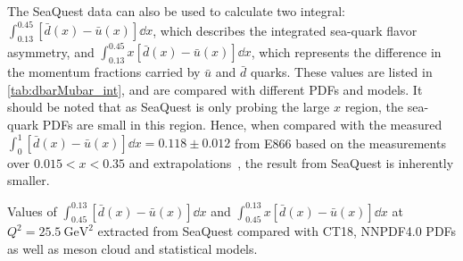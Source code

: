 \documentclass[../main.tex]{subfiles}
\begin{document}
The SeaQuest data can also be used to calculate two integral: $\int^{0.45}_{0.13} \left[\bar{d}\left(x\right) - \bar{u}\left(x\right) \right]\dd{x}$,
which describes the integrated sea-quark flavor asymmetry, and $\int^{0.45}_{0.13} x\left[\bar{d}\left(x\right) - \bar{u}\left(x\right) \right]\dd{x}$,
which represents the difference in the momentum fractions carried by $\bar{u}$ and $\bar{d}$ quarks.
These values are listed in \cref{tab:dbarMubar_int}, and are compared with different PDFs and models.
It should be noted that as SeaQuest is only probing the large $x$ region, the sea-quark PDFs are small in this region.
Hence, when compared with the measured $\int^{1}_{0} \left[\bar{d}\left(x\right) - \bar{u}\left(x\right) \right]\dd{x}=0.118\pm 0.012$
from E866 based on the measurements over $0.015<x<0.35$ and extrapolations~\cite{towell2001},
the result from SeaQuest is inherently smaller.
\begin{table}[htpb!]
	\centering
	\caption{Values of $\int_{0.45}^{0.13} \left[\bar{d}\left(x\right) - \bar{u}\left(x\right)\right] \dd{x}$
		and $\int_{0.45}^{0.13} x\left[\bar{d}\left(x\right) - \bar{u}\left(x\right)\right] \dd{x}$ at $Q^2=\SI{25.5}{\GeV\squared}$ extracted from
		SeaQuest compared with CT18, NNPDF4.0 PDFs as well as meson cloud and statistical models.}
	\label{tab:dbarMubar_int}
	\renewcommand{\arraystretch}{1.5}
	\scalebox{0.93}{
		
	}
\end{table}

\begin{comment}
The impact of the SeaQuest measurement is further illustrated in \cref{fig:JAM_impact}.
The JAM analysis~\cite{cocuzza2021} found that the SeaQuest measurement greatly reduces the
uncertainties on the $\bar{d}/\bar{u}$ ratio, by up to $\approx 50\%$ at $x>0.3$.
The addition of the SeaQuest data also constrain the ratio to remain above unity up to values of $x\approx0.4$,
which is also in better agreement with prediction from various models, including meson-cloud and statistical model.
\begin{figure}[h!]
	\centering
	\texttt{[image: JAM\_impact]}
	\caption{impact on the $\bar{d}/\bar{u}$ ratio (top) and the asymmetry $x\left(\bar{d}-\bar{u}\right)$ (middle)
		of the SeaQuest measurement (red band) and STAR $W$ data \cite{adam2021} (blue band) relative to the baseline (green band)
		where the SeaQuest and STAR measurements are excluded in the JAM analysis~\cite{cocuzza2021}.
		The uncertainty on $\bar{d}/\bar{u}$ for these two scenarios normalized to that of the baseline
		are shown in the bottom panel. Taken from Ref.~\cite{cocuzza2021}.}
	\label{fig:JAM_impact}
\end{figure}
\end{comment}
\end{document}

